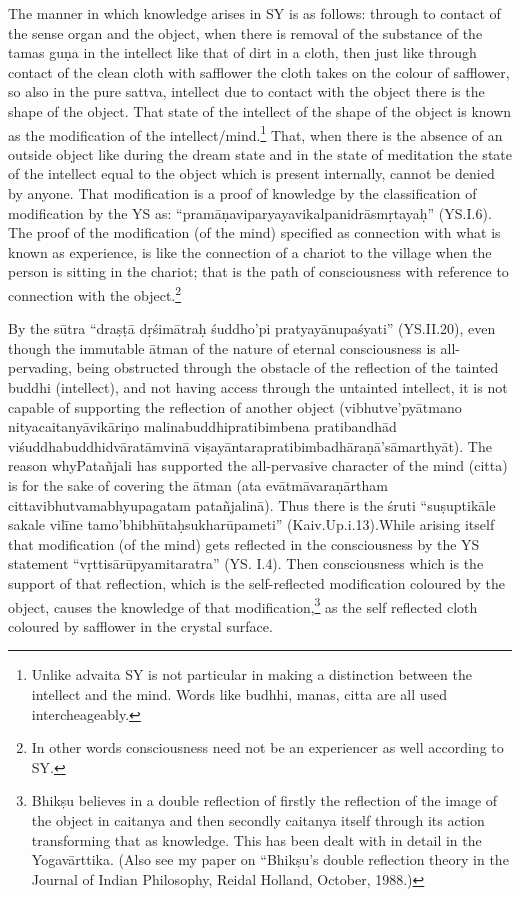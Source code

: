 The manner in which knowledge arises in SY is as follows: through to contact of the sense organ and the object, when there is removal of the substance of the tamas guṇa in the intellect like that of dirt in a cloth, then just like through contact of the clean cloth with safflower the cloth takes on the colour of safflower, so also in the pure sattva, intellect due to contact with the object there is the shape of the object. That state of the intellect of the shape of the object is known as the modification of the intellect/mind.\footnote{Unlike advaita SY is not particular in making a distinction between the intellect and the mind. Words like budhhi, manas, citta are all used intercheageably.} That, when there is the absence of an outside object like during  the dream state and in the state of meditation the state of the intellect equal to the object which is present internally, cannot be denied by anyone. That modification is a proof of knowledge by the classification of modification by the YS as: “pramāṇaviparyayavikalpanidrāsmṛtayaḥ” (YS.I.6). The proof of the modification (of the mind) specified as connection with what is known as experience, is like the connection of a chariot to the village when the person is sitting in the chariot; that is the path of consciousness with reference to connection with the object.\footnote{In other words consciousness need not be an experiencer as well according to SY.} 

By the sūtra “draṣṭā dṛśimātraḥ śuddho’pi pratyayānupaśyati” (YS.\break II.20), even though the immutable ātman of the nature of eternal consciousness is all-pervading, being obstructed through the obstacle of the reflection of the tainted buddhi (intellect), and not having access through the untainted intellect, it is not capable of supporting the reflection of another object (vibhutve’pyātmano nityacaitanyāvikāriṇo malinabuddhipratibimbena pratibandhād viśuddhabuddhidvāratām\break vinā viṣayāntarapratibimbadhāraṇā’sāmarthyāt). The reason why\break Patañjali has supported the all-pervasive character of the mind (citta) is for the sake of covering the ātman (ata evātmāvaraṇārtham cittavibhutvamabhyupagatam patañjalinā). Thus there is the śruti “suṣuptikāle sakale vilīne tamo’bhibhūtaḥsukharūpameti” (Kaiv.Up.i.13).\break While arising itself that modification (of the mind) gets reflected in the consciousness by the YS statement “vṛttisārūpyamitaratra” (YS. I.4). Then consciousness which is the support of that reflection, which is the self-reflected modification coloured by the object, causes the knowledge of that modification,\footnote{Bhikṣu believes in a double reflection of firstly the reflection of the image of the object in caitanya and then secondly caitanya itself through its action transforming that as knowledge. This has been dealt with in detail in the Yogavārttika. (Also see my paper on “Bhikṣu’s double reflection theory in the Journal of Indian Philosophy, Reidal Holland, October, 1988.)} as the self reflected cloth coloured by safflower in the crystal surface. 

